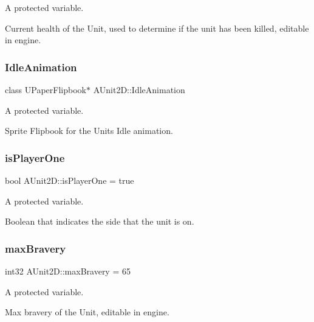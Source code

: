 A protected variable. 

Current health of the Unit, used to determine if the unit has been killed, editable in engine. \hypertarget{class_a_unit2_d_a1c7ee8387eeb37c2c1f735b61135865d}{}\label{class_a_unit2_d_a1c7ee8387eeb37c2c1f735b61135865d} 
\subsubsection{\texorpdfstring{Idle\+Animation}{IdleAnimation}}
{\footnotesize\ttfamily class U\+Paper\+Flipbook$\ast$ A\+Unit2\+D\+::\+Idle\+Animation\hspace{0.3cm}{\ttfamily [protected]}}



A protected variable. 

Sprite Flipbook for the Unit\textquotesingle{}s Idle animation. \hypertarget{class_a_unit2_d_ab916af70c15214293b1f868ef61538e2}{}\label{class_a_unit2_d_ab916af70c15214293b1f868ef61538e2} 
\subsubsection{\texorpdfstring{is\+Player\+One}{isPlayerOne}}
{\footnotesize\ttfamily bool A\+Unit2\+D\+::is\+Player\+One = true\hspace{0.3cm}{\ttfamily [protected]}}



A protected variable. 

Boolean that indicates the side that the unit is on. \hypertarget{class_a_unit2_d_a5e26bf8a80a9363d3538b1e1f675fb61}{}\label{class_a_unit2_d_a5e26bf8a80a9363d3538b1e1f675fb61} 
\subsubsection{\texorpdfstring{max\+Bravery}{maxBravery}}
{\footnotesize\ttfamily int32 A\+Unit2\+D\+::max\+Bravery = 65\hspace{0.3cm}{\ttfamily [protected]}}



A protected variable. 

Max bravery of the Unit, editable in engine. \hypertarget{class_a_unit2_d_a7c93157ba7198cdb15bde2e3b649988d}{}\label{class_a_unit2_d_a7c93157ba7198cdb15bde2e3b649988d} 
